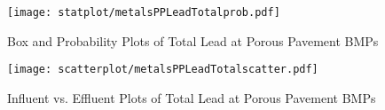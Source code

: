         \begin{figure}[hb]   %
            \centering
            \texttt{[image: statplot/metalsPPLeadTotalprob.pdf]}
            \caption{Box and Probability Plots of Total Lead at Porous Pavement BMPs}
        \end{figure}         %
        
        
        \begin{figure}[hb]   %
            \centering
            \texttt{[image: scatterplot/metalsPPLeadTotalscatter.pdf]}
            \caption{Influent vs. Effluent Plots of Total Lead at Porous Pavement BMPs}
        \end{figure}         %
        \clearpage
        
